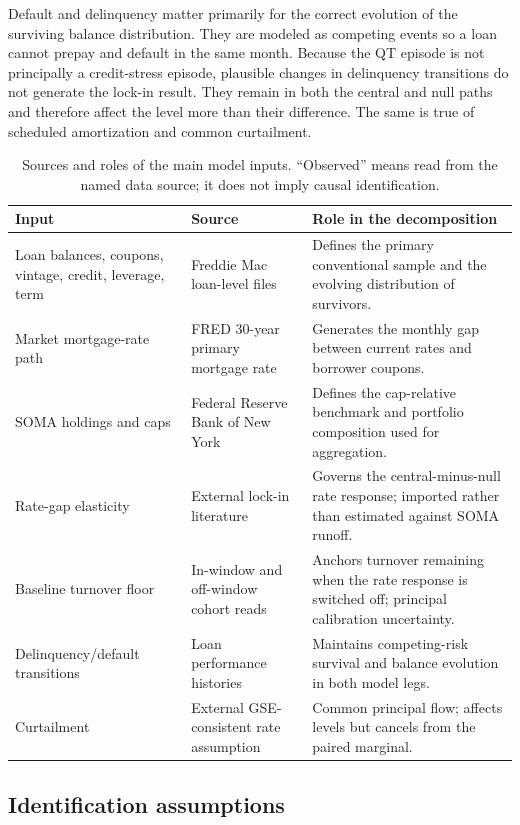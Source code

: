 Default and delinquency matter primarily for the correct evolution of the surviving balance distribution. They are modeled as competing events so a loan cannot prepay and default in the same month. Because the QT episode is not principally a credit-stress episode, plausible changes in delinquency transitions do not generate the lock-in result. They remain in both the central and null paths and therefore affect the level more than their difference. The same is true of scheduled amortization and common curtailment.

\begin{table}[H]
\centering
\small
\caption{Sources and roles of the main model inputs. ``Observed'' means read from the named data source; it does not imply causal identification.}
\label{tab:inputs}\label{tab:estimators}\label{tab:specbox}
\begin{tabular}{@{}p{4.0cm}p{4.0cm}p{6.5cm}@{}}
\toprule
Input & Source & Role in the decomposition \\
\midrule
Loan balances, coupons, vintage, credit, leverage, term & Freddie Mac loan-level files & Defines the primary conventional sample and the evolving distribution of survivors. \\
Market mortgage-rate path & FRED 30-year primary mortgage rate & Generates the monthly gap between current rates and borrower coupons. \\
SOMA holdings and caps & Federal Reserve Bank of New York & Defines the cap-relative benchmark and portfolio composition used for aggregation. \\
Rate-gap elasticity & External lock-in literature & Governs the central-minus-null rate response; imported rather than estimated against SOMA runoff. \\
Baseline turnover floor & In-window and off-window cohort reads & Anchors turnover remaining when the rate response is switched off; principal calibration uncertainty. \\
Delinquency/default transitions & Loan performance histories & Maintains competing-risk survival and balance evolution in both model legs. \\
Curtailment & External GSE-consistent rate assumption & Common principal flow; affects levels but cancels from the paired marginal. \\
\bottomrule
\end{tabular}
\end{table}

\subsection{Identification assumptions}

